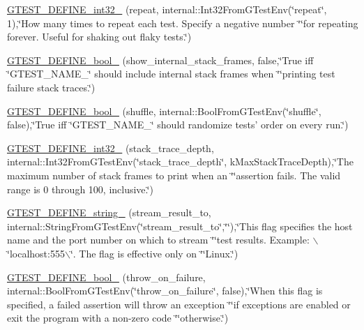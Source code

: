 \begin{DoxyCompactItemize}
\item 
\hyperlink{namespacetesting_a50b0b832aca7fb92c276a1e3d31e050c}{\-G\-T\-E\-S\-T\-\_\-\-D\-E\-F\-I\-N\-E\-\_\-int32\-\_\-} (repeat, internal\-::\-Int32\-From\-G\-Test\-Env(\char`\"{}repeat\char`\"{}, 1),\char`\"{}\-How many times to repeat each test.  \-Specify a negative number \char`\"{}\char`\"{}for repeating forever.  \-Useful for shaking out flaky tests.\char`\"{})
\item 
\hyperlink{namespacetesting_a5d2d141aaea64f415e0c06dac562cfc3}{\-G\-T\-E\-S\-T\-\_\-\-D\-E\-F\-I\-N\-E\-\_\-bool\-\_\-} (show\-\_\-internal\-\_\-stack\-\_\-frames, false,\char`\"{}\-True iff \char`\"{}\-G\-T\-E\-S\-T\-\_\-\-N\-A\-M\-E\-\_\-\char`\"{} should include internal stack frames when \char`\"{}\char`\"{}printing test failure stack traces.\char`\"{})
\item 
\hyperlink{namespacetesting_a279842981ac3331c373ebcdcee0cfb95}{\-G\-T\-E\-S\-T\-\_\-\-D\-E\-F\-I\-N\-E\-\_\-bool\-\_\-} (shuffle, internal\-::\-Bool\-From\-G\-Test\-Env(\char`\"{}shuffle\char`\"{}, false),\char`\"{}\-True iff \char`\"{}\-G\-T\-E\-S\-T\-\_\-\-N\-A\-M\-E\-\_\-\char`\"{} should randomize tests' order on every run.\char`\"{})
\item 
\hyperlink{namespacetesting_a18e317789f8ddb3b7a828ef8587f098e}{\-G\-T\-E\-S\-T\-\_\-\-D\-E\-F\-I\-N\-E\-\_\-int32\-\_\-} (stack\-\_\-trace\-\_\-depth, internal\-::\-Int32\-From\-G\-Test\-Env(\char`\"{}stack\-\_\-trace\-\_\-depth\char`\"{}, k\-Max\-Stack\-Trace\-Depth),\char`\"{}\-The maximum number of stack frames to print when an \char`\"{}\char`\"{}assertion fails.  \-The valid range is 0 through 100, inclusive.\char`\"{})
\item 
\hyperlink{namespacetesting_a8755450a9b287a52c02a3f1686df648c}{\-G\-T\-E\-S\-T\-\_\-\-D\-E\-F\-I\-N\-E\-\_\-string\-\_\-} (stream\-\_\-result\-\_\-to, internal\-::\-String\-From\-G\-Test\-Env(\char`\"{}stream\-\_\-result\-\_\-to\char`\"{},\char`\"{}\char`\"{}),\char`\"{}\-This flag specifies the host name and the port number on which to stream \char`\"{}\char`\"{}test results. \-Example\-: $\backslash$\char`\"{}localhost\-:555$\backslash$\char`\"{}. \-The flag is effective only on \char`\"{}\char`\"{}\-Linux.\char`\"{})
\item 
\hyperlink{namespacetesting_ab114e35b616ae3f73277ddc861c90b76}{\-G\-T\-E\-S\-T\-\_\-\-D\-E\-F\-I\-N\-E\-\_\-bool\-\_\-} (throw\-\_\-on\-\_\-failure, internal\-::\-Bool\-From\-G\-Test\-Env(\char`\"{}throw\-\_\-on\-\_\-failure\char`\"{}, false),\char`\"{}\-When this flag is specified, a failed assertion will throw an exception \char`\"{}\char`\"{}if exceptions are enabled or exit the program with a non-\/zero code \char`\"{}\char`\"{}otherwise.\char`\"{})

\end{DoxyCompactItemize}
